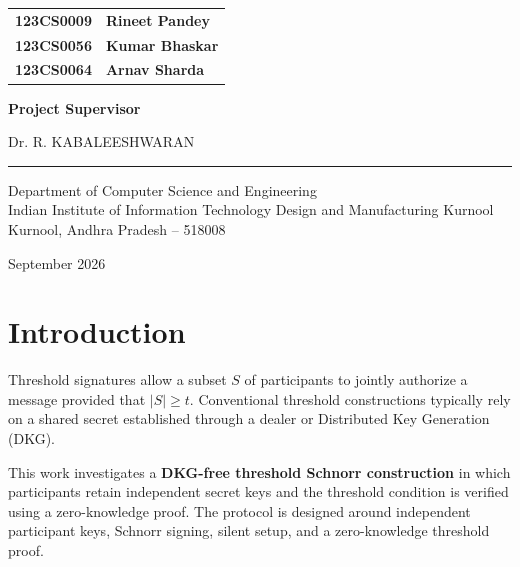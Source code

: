 \documentclass[10pt,a4paper]{article}
\begin{document}
\begin{center}
\renewcommand{\arraystretch}{1.35}

\begin{tabular}{c l}
\textbf{123CS0009} & \textbf{Rineet Pandey}\\
\textbf{123CS0056} & \textbf{Kumar Bhaskar}\\
\textbf{123CS0064} & \textbf{Arnav Sharda}
\end{tabular}

\vspace{1.0cm}

{\large\bfseries
Project Supervisor
}

\vspace{0.3cm}

{\large
Dr. R. KABALEESHWARAN
}

\vfill

\rule{0.55\textwidth}{0.4pt}

\vspace{0.35cm}

{\normalsize
Department of Computer Science and Engineering\\
Indian Institute of Information Technology Design and Manufacturing Kurnool\\
Kurnool, Andhra Pradesh -- 518008
}

\vspace{0.35cm}

{\normalsize
September 2026
}

\end{center}


\newpage

\section{Introduction}

Threshold signatures allow a subset $S$ of participants to jointly authorize
a message provided that $|S|\geq t$. Conventional threshold constructions
typically rely on a shared secret established through a dealer or Distributed
Key Generation (DKG).

This work investigates a \textbf{DKG-free threshold Schnorr construction} in
which participants retain independent secret keys and the threshold condition
is verified using a zero-knowledge proof. The protocol is designed around
independent participant keys, Schnorr signing, silent setup, and a
zero-knowledge threshold proof.
\end{document}
